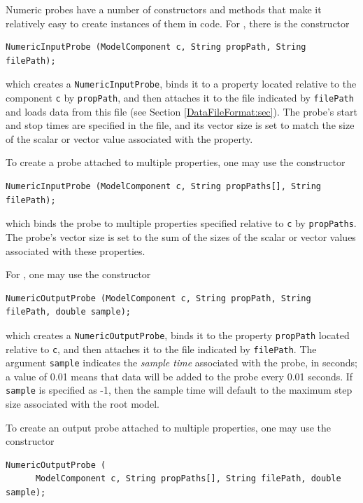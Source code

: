 Numeric probes have a number of constructors and methods that make it
relatively easy to create instances of them in code. For 
, there
is the constructor
\begin{lstlisting}[]
   NumericInputProbe (ModelComponent c, String propPath, String filePath);
\end{lstlisting}
%
which creates a {\tt NumericInputProbe}, binds it to a property
located relative to the component {\tt c} by {\tt propPath}, and then
attaches it to the file indicated by {\tt filePath} and loads data
from this file (see Section \ref{DataFileFormat:sec}). The probe's start and
stop times are specified in the file, and its vector size is
set to match the size of the scalar or vector value associated with
the property.

To create a probe attached to multiple properties, one may use the
constructor
\begin{lstlisting}[]
   NumericInputProbe (ModelComponent c, String propPaths[], String filePath);
\end{lstlisting}
%
which binds the probe to multiple properties specified relative to
{\tt c} by {\tt propPaths}. The probe's vector size is set to
the sum of the sizes of the scalar or vector values associated with
these properties.

For , one may use
the constructor
\begin{lstlisting}[]
   NumericOutputProbe (ModelComponent c, String propPath, String filePath, double sample);
\end{lstlisting}
%
which creates a {\tt NumericOutputProbe}, binds it to the property
{\tt propPath} located relative to {\tt c}, and then attaches it to
the file indicated by {\tt filePath}. The argument {\tt sample}
indicates the {\it sample time} associated with the probe, in seconds;
a value of 0.01 means that data will be added to the probe every 0.01
seconds.  If {\tt sample} is specified as -1, then the sample time
will default to the maximum step size associated with the root model.

To create an output probe attached to multiple properties, one may use the
constructor
\begin{lstlisting}[]
   NumericOutputProbe (
      ModelComponent c, String propPaths[], String filePath, double sample);
\end{lstlisting}
%

